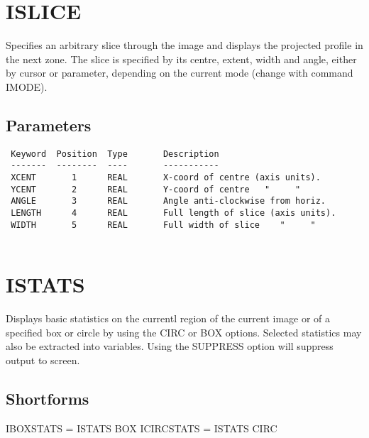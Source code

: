\documentclass{book}
\renewcommand{\_}{{\tt\char'137}}     %
\begin{document}
\section{ISLICE}
Specifies an arbitrary slice through the image and displays the
projected profile in the next zone. The slice is specified by
its centre, extent, width and angle, either by cursor or parameter,
depending on the current mode (change with command IMODE).
 
\subsection{Parameters}
\begin{verbatim}
 Keyword  Position  Type       Description
 -------  --------  ----       -----------
 XCENT       1      REAL       X-coord of centre (axis units).
 YCENT       2      REAL       Y-coord of centre   "     "
 ANGLE       3      REAL       Angle anti-clockwise from horiz.
 LENGTH      4      REAL       Full length of slice (axis units).
 WIDTH       5      REAL       Full width of slice    "     "
 
\end{verbatim}\section{ISTATS}
Displays basic statistics on the currentl region of the current
image or of a specified box or circle by using the CIRC or BOX
options. Selected statistics may also be extracted into
variables. Using the SUPPRESS option will suppress output to
screen.
 
\subsection{Shortforms}
IBOXSTATS = ISTATS BOX
ICIRCSTATS = ISTATS CIRC
\end{document}
